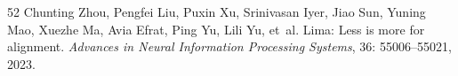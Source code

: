 \begin{thebibliography}{52}
Chunting Zhou, Pengfei Liu, Puxin Xu, Srinivasan Iyer, Jiao Sun, Yuning Mao, Xuezhe Ma, Avia Efrat, Ping Yu, Lili Yu, et~al.
\newblock Lima: Less is more for alignment.
\newblock \emph{Advances in Neural Information Processing Systems}, 36: 55006--55021, 2023.

\end{thebibliography}
